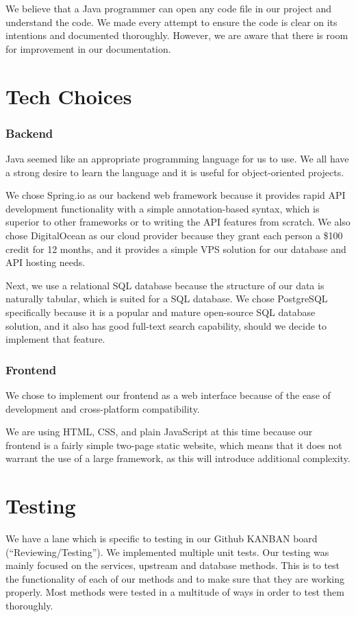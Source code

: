 \documentclass[fontsize=14pt]{article}
\begin{document}
We believe that a Java programmer can open any code file in our project and understand the code. We made every attempt to ensure the code is clear on its intentions and documented thoroughly. However, we are aware that there is room for improvement in our documentation.

\section*{Tech Choices} 
\subsubsection*{Backend}
Java seemed like an appropriate programming language for us to use. We all have a strong desire to learn the language and it is useful for object-oriented projects.

We chose Spring.io as our backend web framework because it provides rapid API development functionality with a simple annotation-based syntax, which is superior to other frameworks or to writing the API features from scratch. We also chose DigitalOcean as our cloud provider because they grant each person a \$100 credit for 12 months, and it provides a simple VPS solution for our database and API hosting needs.

Next, we use a relational SQL database because the structure of our data is naturally tabular, which is suited for a SQL database. We chose PostgreSQL specifically because it is a popular and mature open-source SQL database solution, and it also has good full-text search capability, should we decide to implement that feature.

\subsubsection*{Frontend}
We chose to implement our frontend as a web interface because of the ease of development and cross-platform compatibility. 

We are using HTML, CSS, and plain JavaScript at this time because our frontend is a fairly simple two-page static website, which means that it does not warrant the use of a large framework, as this will introduce additional complexity. 

\section*{Testing}
We have a lane which is specific to testing in our Github KANBAN board (``Reviewing/Testing''). We implemented multiple unit tests. Our testing was mainly focused on the services, upstream and database methods. This is to test the functionality of each of our methods and to make sure that they are working properly. Most methods were tested in a multitude of ways in order to test them thoroughly.
\end{document}
